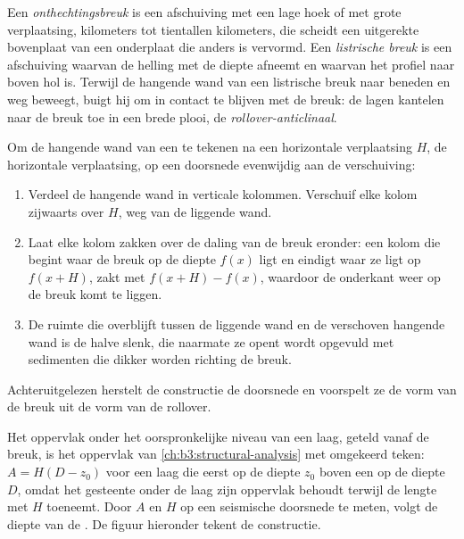 \begin{definition}\label{def:b3:extension-strike-slip:detachment}
Een \emph{onthechtingsbreuk} is een afschuiving met een lage hoek
of  met grote verplaatsing, kilometers tot tientallen kilometers, die
scheidt een uitgerekte bovenplaat van een onderplaat die anders is vervormd. Een
\emph{listrische breuk} is een afschuiving waarvan de helling
met de diepte afneemt en waarvan het profiel naar boven hol is. Terwijl de hangende wand van een
listrische breuk naar beneden en weg beweegt, buigt hij om in contact te blijven met de
breuk: de lagen kantelen naar de breuk toe in een brede plooi, de
\emph{rollover-anticlinaal}.
\end{definition}

\begin{method}\label{met:b3:extension-strike-slip:heave}
Om de hangende wand van een  te tekenen na een horizontale verplaatsing
$H$, de horizontale verplaatsing, op een doorsnede evenwijdig aan de verschuiving:
\begin{enumerate}
  \item Verdeel de hangende wand in verticale kolommen. Verschuif elke kolom zijwaarts
        over $H$, weg van de liggende wand.
  \item Laat elke kolom zakken over de daling van de breuk eronder: een kolom die
        begint waar de breuk op de diepte $f(x)$ ligt en eindigt waar ze
        ligt op $f(x + H)$, zakt met $f(x + H) - f(x)$, waardoor de onderkant
        weer op de breuk komt te liggen.
  \item De ruimte die overblijft tussen de liggende wand en de verschoven hangende wand is de
        halve slenk, die naarmate ze opent wordt opgevuld met sedimenten die dikker worden richting de
        breuk.
\end{enumerate}
Achteruitgelezen herstelt de constructie de doorsnede en voorspelt ze de vorm van de
breuk uit de vorm van de rollover.
\end{method}

Het oppervlak onder het oorspronkelijke niveau van een laag, geteld vanaf de breuk, is
het oppervlak van \cref{ch:b3:structural-analysis} met omgekeerd teken: $A =
H(D - z_0)$ voor een laag die eerst op de diepte $z_0$ boven een  op de
diepte $D$, omdat het gesteente onder de laag zijn oppervlak behoudt terwijl de lengte
met $H$ toeneemt. Door $A$ en $H$ op een seismische doorsnede te meten, volgt de diepte van de
. De figuur hieronder tekent de constructie.

